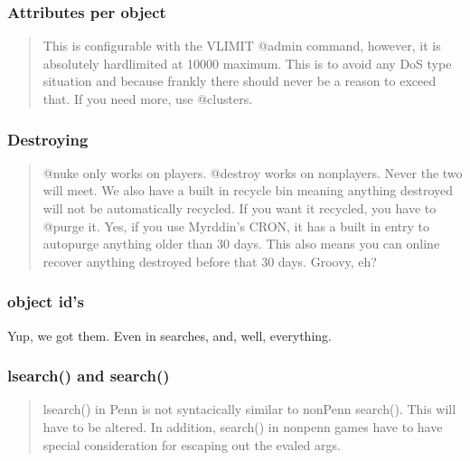 \documentclass[letterpaper,10pt,english]{sphinxmanual}
\begin{document}
\subsubsection{Attributes per object}
\label{\detokenize{differences:attributes-per-object}}\begin{quote}

\sphinxAtStartPar
This is configurable with the VLIMIT @admin
command, however, it is absolutely hard\sphinxhyphen{}limited at 10000 maximum.
This is to avoid any DoS type situation and because frankly there
should never be a reason to exceed that.  If you need more, use
@clusters.
\end{quote}


\subsubsection{Destroying}
\label{\detokenize{differences:destroying}}\begin{quote}

\sphinxAtStartPar
@nuke only works on players.  @destroy works on non\sphinxhyphen{}players.
Never the two will meet.  We also have a built in recycle bin meaning
anything destroyed will not be automatically recycled.  If you want it
recycled, you have to @purge it.  Yes, if you use  Myrddin’s CRON, it
has a built in entry to auto\sphinxhyphen{}purge anything older than 30 days.  This
also means you can on\sphinxhyphen{}line recover anything destroyed before that 30
days.  Groovy, eh?
\end{quote}


\subsubsection{object id’s}
\label{\detokenize{differences:object-id-s}}
\sphinxAtStartPar
Yup, we got them.  Even in searches, and, well, everything.


\subsubsection{lsearch() and search()}
\label{\detokenize{differences:lsearch-and-search}}\begin{quote}

\sphinxAtStartPar
lsearch() in Penn is not syntacically similar to non\sphinxhyphen{}Penn search().
This will have to be altered.  In addition, search() in non\sphinxhyphen{}penn games
have to have special consideration for escaping out the evaled args.
\end{quote}
\end{document}
